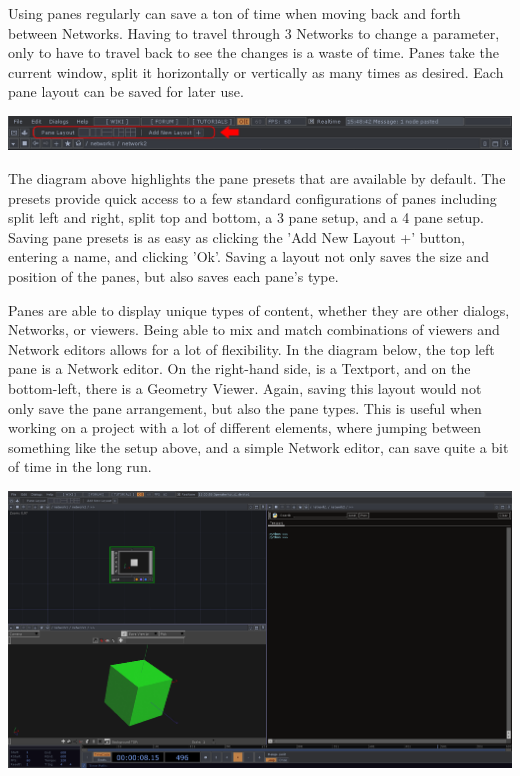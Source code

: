 \begin{fullwidth}

Using panes regularly can save a ton of time when moving back and forth between Networks. Having to travel through 3 Networks to change a parameter, only to have to travel back to see the changes is a waste of time. Panes take the current window, split it horizontally or vertically as many times as desired. Each pane layout can be saved for later use. 

\begin{center}
\includegraphics{./img/2.5/panes-1.png}
\end{center}

The diagram above highlights the pane presets that are available by default. The presets provide quick access to a few standard configurations of panes including split left and right, split top and bottom, a 3 pane setup, and a 4 pane setup. Saving pane presets is as easy as clicking the 'Add New Layout +' button, entering a name, and clicking 'Ok'. Saving a layout not only saves the size and position of the panes, but also saves each pane's type. 

Panes are able to display unique types of content, whether they are other dialogs, Networks, or viewers. Being able to mix and match combinations of viewers and Network editors allows for a lot of flexibility. In the diagram below, the top left pane is a Network editor. On the right-hand side, is a Textport, and on the bottom-left, there is a Geometry Viewer. Again, saving this layout would not only save the pane arrangement, but also the pane types. This is useful when working on a project with a lot of different elements, where jumping between something like the setup above, and a simple Network editor, can save quite a bit of time in the long run.

\begin{center}
\includegraphics{./img/2.5/panes-2.png}
\end{center}


\end{fullwidth}
